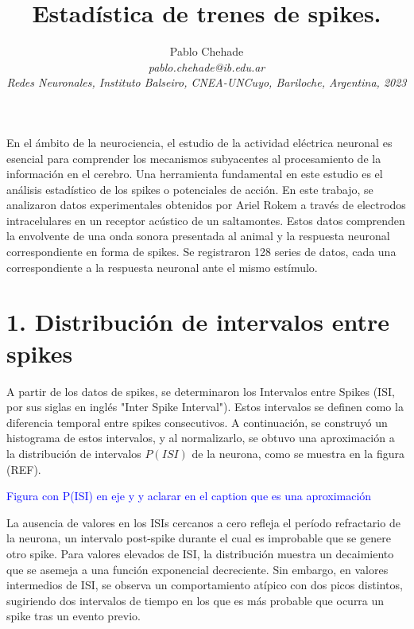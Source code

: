 \documentclass[aps,prb,twocolumn,superscriptaddress,floatfix,longbibliography]{revtex4-2}
\newcounter{para}
\begin{document}
\newcommand{\mytitle}{Estadística de trenes de spikes.}

\title{\mytitle}

\author{Pablo Chehade \\
    \small \textit{pablo.chehade@ib.edu.ar} \\
    \small \textit{Redes Neuronales, Instituto Balseiro, CNEA-UNCuyo, Bariloche, Argentina, 2023} \\}
    
    
    
\maketitle

En el ámbito de la neurociencia, el estudio de la actividad eléctrica neuronal es esencial para comprender los mecanismos subyacentes al procesamiento de la información en el cerebro. Una herramienta fundamental en este estudio es el análisis estadístico de los spikes o potenciales de acción. En este trabajo, se analizaron datos experimentales obtenidos por Ariel Rokem a través de electrodos intracelulares en un receptor acústico de un saltamontes. Estos datos comprenden la envolvente de una onda sonora presentada al animal y la respuesta neuronal correspondiente en forma de spikes. Se registraron 128 series de datos, cada una correspondiente a la respuesta neuronal ante el mismo estímulo.

\section{1. Distribución de intervalos entre spikes}

A partir de los datos de spikes, se determinaron los Intervalos entre Spikes (ISI, por sus siglas en inglés "Inter Spike Interval"). Estos intervalos se definen como la diferencia temporal entre spikes consecutivos. A continuación, se construyó un histograma de estos intervalos, y al normalizarlo, se obtuvo una aproximación a la distribución de intervalos \(P(ISI)\) de la neurona, como se muestra en la figura (REF).

\textcolor{blue}{Figura con P(ISI) en eje y y aclarar en el caption que es una aproximación}



La ausencia de valores en los ISIs cercanos a cero refleja el período refractario de la neurona, un intervalo post-spike durante el cual es improbable que se genere otro spike. Para valores elevados de ISI, la distribución muestra un decaimiento que se asemeja a una función exponencial decreciente. Sin embargo, en valores intermedios de ISI, se observa un comportamiento atípico con dos picos distintos, sugiriendo dos intervalos de tiempo en los que es más probable que ocurra un spike tras un evento previo.
\end{document}
